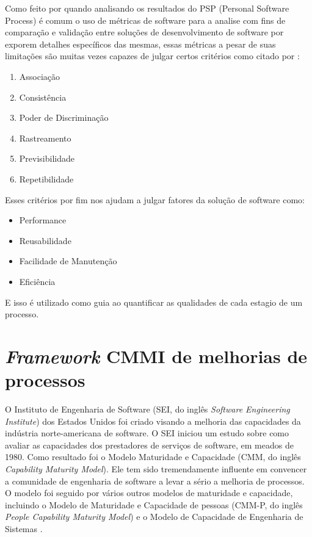 \documentclass[12pt]{article}
\begin{document}
Como feito por \cite{humphrey1999pathways} quando analisando os resultados do PSP (Personal Software Process) é comum o uso de métricas de software para a analise com fins de comparação e validação entre soluções de desenvolvimento de software por exporem detalhes específicos das mesmas, essas métricas a pesar de suas limitações são muitas vezes capazes de julgar certos critérios como citado por \cite{schneidewind1992methodology}:
\begin{enumerate}
    \item Associação
    \item Consistência
    \item Poder de Discriminação
    \item Rastreamento
    \item Previsibilidade
    \item Repetibilidade
\end{enumerate}
Esses critérios por fim nos ajudam a julgar fatores da solução de software como:
\begin{itemize}
    \item Performance
    \item Reusabilidade
    \item Facilidade de Manutenção
    \item Eficiência
\end{itemize}
E isso é utilizado como guia ao quantificar as qualidades de cada estagio de um processo.

\section{\textit{Framework} CMMI de melhorias de processos}

O Instituto de Engenharia de Software (SEI, do inglês \textit{Software Engineering Institute}) dos Estados Unidos foi criado visando a melhoria das capacidades da indústria norte-americana de software. O SEI iniciou um estudo sobre como avaliar as capacidades dos prestadores de serviços de software, em meados de 1980. Como resultado foi o Modelo Maturidade e Capacidade (CMM, do inglês \textit{Capability Maturity Model}). Ele tem sido tremendamente influente em convencer a comunidade de engenharia de software a levar a sério a melhoria de processos. O modelo foi seguido por vários outros modelos de maturidade e capacidade, incluindo o Modelo de Maturidade e Capacidade de pessoas (CMM-P, do inglês \textit{People Capability Maturity Model}) e o Modelo de Capacidade de Engenharia de Sistemas \cite{sommerville2007engenharia}.
\end{document}
